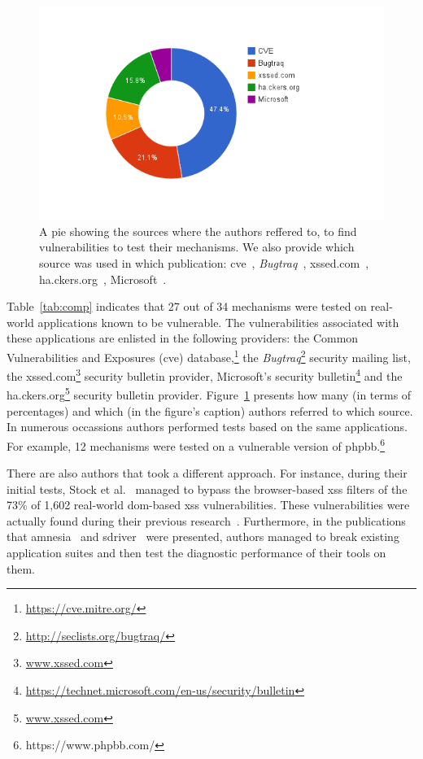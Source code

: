 \documentclass[conference]{IEEEtran}
\begin{document}
\begin{figure}
\begin{center}
\leavevmode
\includegraphics[scale=0.47]{defect-percentages.png}
\end{center}
\caption{\label{fig:defect_sources}A pie showing the sources
where the authors reffered to, to find vulnerabilities to test
their mechanisms. We also provide which source was used
in which publication:
{\sc cve}~\cite{XBS06,NLC07,VFJKKV07,PMP11,BK04,JB07,SMS13,WPLKK09,JKK06a},
{\it Bugtraq}~\cite{PB05,KKVJ06,KJKV09,JEP08},
{\sc xss}ed.com~\cite{NSS06,APKLM10},
ha.ckers.org~\cite{TNH07,PSC09,LV09},
Microsoft~\cite{RDWDE07}.}
\end{figure}

Table~\ref{tab:comp} indicates that 27 out of
34 mechanisms were tested on real-world applications
known to be vulnerable. The vulnerabilities
associated with these applications are enlisted
in the following providers: the Common Vulnerabilities
and Exposures ({\sc cve})
database,\footnote{\url{https://cve.mitre.org/}}
the {\it Bugtraq}\footnote{\url{http://seclists.org/bugtraq/}}
security mailing list, the
{\sc xss}ed.com\footnote{\url{www.xssed.com}}
security bulletin provider, Microsoft's security
bulletin\footnote{\url{https://technet.microsoft.com/en-us/security/bulletin}}
and the ha.ckers.org\footnote{\url{www.xssed.com}}
security bulletin provider. Figure~\ref{fig:defect_sources}
presents how many (in terms of percentages) and which
(in the figure's caption) authors referred to which source.
In numerous occassions authors performed tests based
on the same applications. For example, 12 mechanisms
were tested on a vulnerable version of
{\sc phpbb}.\footnote{https://www.phpbb.com/}

There are also authors that took a different approach.
For instance, during their initial tests,
Stock et al.~\cite{SLMS14} managed to bypass
the browser-based {\sc xss} filters of the
73\% of 1,602 real-world {\sc dom}-based {\sc xss} vulnerabilities.
These vulnerabilities were actually found during
their previous research~\cite{LSJ13}.
Furthermore, in the publications that
{\sc amnesia}~\cite{HO05,HO06,HO05b}
and {\sc sd}river~\cite{MS09,MKS09,MKLS11} were presented,
authors managed to break existing application suites
and then test the diagnostic performance of their tools on them.
\end{document}
